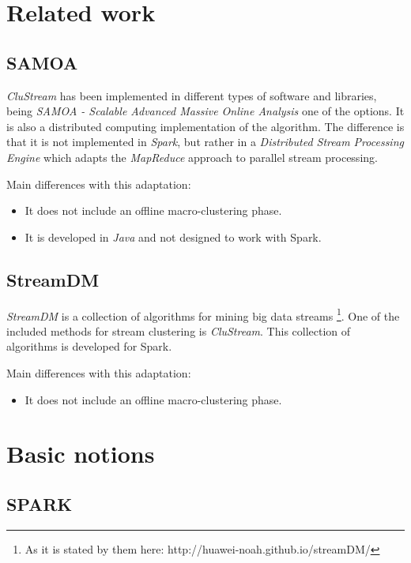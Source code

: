 \documentclass{llncs}
\begin{document}
\section{Related work}

\subsection{SAMOA}

\textit{CluStream} has been implemented in different types of software and libraries, being \textit{SAMOA - Scalable Advanced Massive Online Analysis} one of the options. It is also a distributed computing implementation of the algorithm. The difference is that it is not implemented in \textit{Spark}, but rather in a \textit{Distributed Stream Processing Engine} which adapts the \textit{MapReduce} approach to parallel stream processing\cite{samoa}.

Main differences with this adaptation: 

\begin{itemize}
 \item It does not include an offline macro-clustering phase.
 \item It is developed in \textit{Java} and not designed to work with Spark.
\end{itemize}

\subsection{StreamDM}

\textit{StreamDM} is a collection of algorithms for mining big data streams \footnote{As it is stated by them here: http://huawei-noah.github.io/streamDM/}. One of the included methods for stream clustering is \textit{CluStream}. This collection of algorithms is developed for Spark.

Main differences with this adaptation: 

\begin{itemize}
 \item It does not include an offline macro-clustering phase.
\end{itemize}

\section{Basic notions}

\subsection{SPARK}
\end{document}
